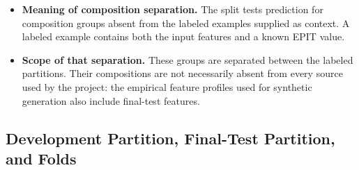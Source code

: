 \documentclass[11pt]{article}
\newenvironment{notes}
  {\begin{itemize}\setlength{\itemsep}{0.45em}\setlength{\parsep}{0pt}}
  {\end{itemize}}
\begin{document}
\begin{notes}
    \item \textbf{Meaning of composition separation.} The split tests
    prediction for composition groups absent from the labeled examples
    supplied as context. A labeled example contains both the input
    features and a known EPIT value.

    \item \textbf{Scope of that separation.} These groups are separated
    between the labeled partitions. Their compositions are not
    necessarily absent from every source used by the project:
    the empirical feature profiles used for synthetic generation also
    include final-test features.
\end{notes}

\subsection{Development Partition, Final-Test Partition, and Folds}
\label{sec:dataset-partitions}
\end{document}
